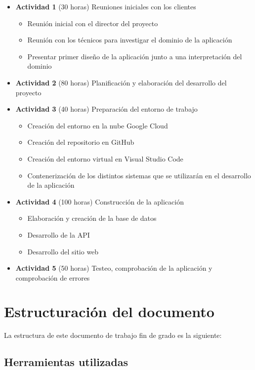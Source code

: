 \begin{itemize}
    \item \textbf{Actividad 1} (30 horas) Reuniones iniciales con los clientes
    \begin{itemize}
        \item Reunión inicial con el director del proyecto
        \item Reunión con los técnicos para investigar el dominio de la aplicación
        \item Presentar primer diseño de la aplicación junto a una interpretación del dominio
    \end{itemize}
    \item \textbf{Actividad 2} (80 horas) Planificación y elaboración del desarrollo del proyecto
    \item \textbf{Actividad 3} (40 horas) Preparación del entorno de trabajo
    \begin{itemize}
        \item Creación del entorno en la nube Google Cloud
        \item Creación del repositorio en GitHub
        \item Creación del entorno virtual en Visual Studio Code
        \item Contenerización de los distintos sistemas que se utilizarán en el desarrollo de la aplicación
    \end{itemize}
    \item \textbf{Actividad 4} (100 horas) Construcción de la aplicación
    \begin{itemize}
        \item Elaboración y creación de la base de datos
        \item Desarrollo de la API
        \item Desarrollo del sitio web
    \end{itemize}
    \item \textbf{Actividad 5} (50 horas) Testeo, comprobación de la aplicación y comprobación de errores 
\end{itemize}


\section{Estructuración del documento}

La estructura de este documento de trabajo fin de grado es la siguiente:

\subsection{Herramientas utilizadas}

